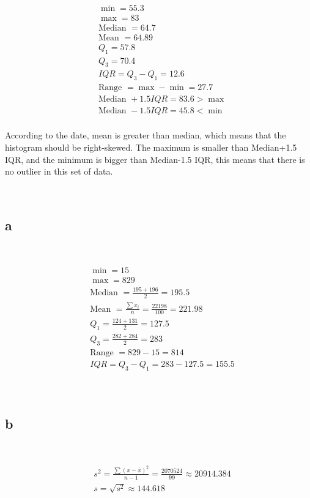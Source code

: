 \documentclass{article}
\begin{document}
~

\begin{align*}
    &\min=55.3\\
    &\max=83\\
    &\text{Median }=64.7\\
    &\text{Mean }=64.89\\
    &Q_1=57.8\\
    &Q_3=70.4\\
    &IQR=Q_3-Q_1=12.6\\
    &\text{Range }=\max-\min=27.7\\
    &\text{Median }+1.5IQR=83.6>\max\\
    &\text{Median }-1.5IQR=45.8<\min\\
\end{align*}

According to the date, mean is greater than median, which means that the histogram should be right-skewed. The maximum is smaller than Median+1.5 IQR, and the minimum is bigger than Median-1.5 IQR, this means that there is no outlier in this set of data.

\newpage

~

\subsection*{a}

~

\begin{align*}
    &\min=15\\
    &\max=829\\
    &\text{Median }=\frac{195+196}{2}=195.5\\
    &\text{Mean }=\frac{\sum x_i}{n}=\frac{22198}{100}=221.98\\
    &Q_1=\frac{124+131}{2}=127.5\\
    &Q_3=\frac{282+284}{2}=283\\
    &\text{Range }=829-15=814\\
    &IQR=Q_3-Q_1=283-127.5=155.5\\
\end{align*}

~

\subsection*{b}

~

\begin{align*}
    &s^2=\frac{\sum(x-\overline{x})^2}{n-1}=\frac{2070524}{99}\approx 20914.384\\
    &s=\sqrt{s^2}\approx144.618\\
\end{align*}
\end{document}
